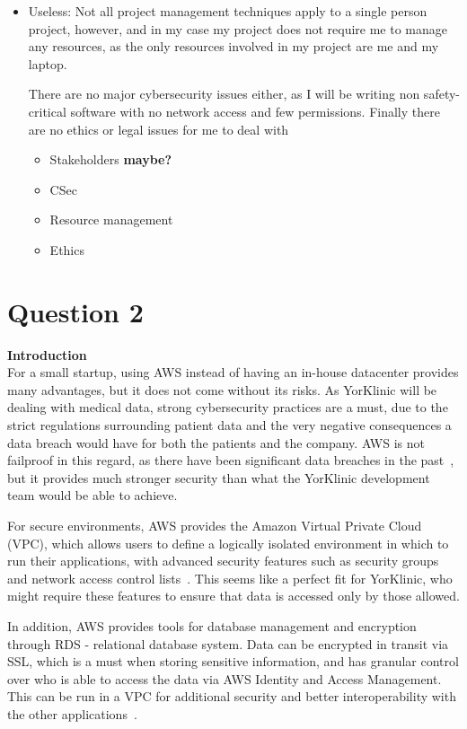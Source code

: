 \documentclass[12pt]{article}
\begin{document}
\begin{itemize}
    \item Useless:
    Not all project management techniques apply to a single person project, however, and in my case my project does not require me to manage any resources, as the only resources involved in my project are me and my laptop.

    There are no major cybersecurity issues either, as I will be writing non safety-critical software with no network access and few permissions. Finally there are no ethics or legal issues for me to deal with
\begin{itemize}
    \item Stakeholders \textbf{maybe?}
    \item CSec
    \item Resource management
    \item Ethics
\end{itemize}
\end{itemize}

\section*{Question 2}
\textbf{Introduction}\\
For a small startup, using AWS instead of having an in-house datacenter provides many advantages, but it does not come without its risks. As YorKlinic will be dealing with medical data, strong cybersecurity practices are a must, due to the strict regulations surrounding patient data and the very negative consequences a data breach would have for both the patients and the company. AWS is not failproof in this regard, as there have been significant data breaches in the past~\cite{breach}, but it provides much stronger security than what the YorKlinic development team would be able to achieve.

For secure environments, AWS provides the Amazon Virtual Private Cloud (VPC), which allows users to define a logically isolated environment in which to run their applications, with advanced security features such as security groups and network access control lists~\cite{vpc}. This seems like a perfect fit for YorKlinic, who might require these features to ensure that data is accessed only by those allowed.
    
In addition, AWS provides tools for database management and encryption through RDS \-- relational database system. Data can be encrypted in transit via SSL, which is a must when storing sensitive information, and has granular control over who is able to access the data via AWS Identity and Access Management. This can be run in a VPC for additional security and better interoperability with the other applications~\cite{rds}.
\end{document}

